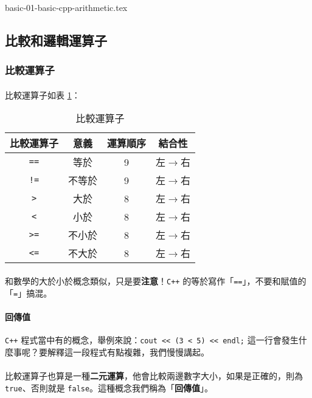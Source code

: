 \documentclass[12pt,a4paper,oneside]{article}
\begin{document}
\begin{CJK}{UTF8}{bkai}
\label{basic:cpp:problem:arithmetic}
{basic-01-basic-cpp-arithmetic.tex}

\subsection{比較和邏輯運算子}
\subsubsection{比較運算子}

\paragraph{}比較運算子如表 \ref{basic:cpp:table:operator:comparison}：
\begin{table}[h!]
\centering
\begin{tabular}{|c|c|c|c|}
\hline
比較運算子 & 意義 & 運算順序 & 結合性\\
\hline
\hline
\lstinline!==! & 等於 & 9 & 左$\rightarrow$右\\
\hline
\lstinline"!=" & 不等於 & 9 & 左$\rightarrow$右\\
\hline
\lstinline!>!  & 大於 & 8 & 左$\rightarrow$右\\
\hline
\lstinline!<!  & 小於 & 8 & 左$\rightarrow$右\\
\hline
\lstinline!>=! & 不小於 & 8 & 左$\rightarrow$右\\
\hline
\lstinline!<=! & 不大於 & 8 & 左$\rightarrow$右\\
\hline
\end{tabular}
\caption{比較運算子}
\label{basic:cpp:table:operator:comparison}
\end{table}

\paragraph{}和數學的大於小於概念類似，只是要\textbf{注意}！\texttt{C++} 的等於寫作「\lstinline!==!」，不要和賦值的「\lstinline!=!」搞混。
\paragraph{回傳值} \texttt{C++} 程式當中有的概念，舉例來說：\lstinline!cout << (3 < 5) << endl;! 這一行會發生什麼事呢？要解釋這一段程式有點複雜，我們慢慢講起。
\paragraph{}比較運算子也算是一種\textbf{二元運算}，他會比較兩邊數字大小，如果是正確的，則為 \lstinline!true!、否則就是 \lstinline!false!。這種概念我們稱為「\textbf{回傳值}」。

\end{CJK}
\end{document}
